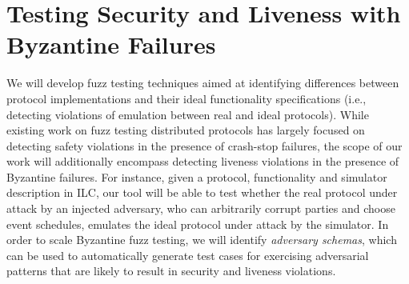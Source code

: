 \section{Testing Security and Liveness with Byzantine Failures}
\label{sec:testing}

We will develop fuzz testing techniques aimed at identifying differences between
protocol implementations and their ideal functionality specifications (i.e.,
detecting violations of emulation between real and ideal protocols). While
existing work on fuzz testing distributed protocols has largely focused on
detecting safety violations in the presence of crash-stop failures, the scope of
our work will additionally encompass detecting liveness violations in the
presence of Byzantine failures. For instance, given a protocol, functionality
and simulator description in ILC, our tool will be able to test whether the
real protocol under attack by an injected adversary, who can arbitrarily corrupt
parties and choose event schedules, emulates the ideal protocol under attack by
the simulator. In order to scale Byzantine fuzz testing, we will identify
\emph{adversary schemas}, which can be used to automatically generate test cases
for exercising adversarial patterns that are likely to result in security and
liveness violations.
